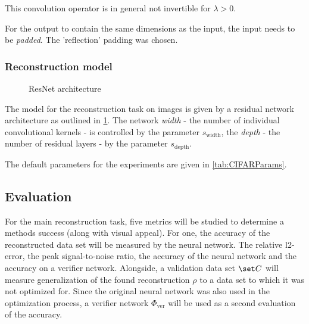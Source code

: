 This convolution operator is in general not invertible for $\lambda > 0$.

For the output to contain the same dimensions as the input, the input needs to be \textit{padded}.
The 'reflection' padding was chosen.


\subsubsection{Reconstruction model}

\begin{figure}
\begin{minipage}{0.5\textwidth}
\centering

\end{minipage}
\begin{minipage}{0.5\textwidth}
\centering

\end{minipage}
\caption{ResNet architecture}
\label{fig:resnet}
\end{figure}

The model for the reconstruction task on images is given by a residual network architecture
as outlined in \ref{fig:resnet}. 
The network \textit{width} - the number of individual convolutional kernels - is controlled by the parameter $s_\text{width}$, the \textit{depth} - the number of residual layers - by the parameter
$s_\text{depth}$.

The default parameters for the experiments are given in \ref{tab:CIFARParams}.




\subsection{Evaluation}




For the main reconstruction task, 
five metrics will be studied to determine a methods success (along with visual appeal).
For one, the accuracy of the reconstructed data set will be measured by the neural network.
The relative l2-error, the peak signal-to-noise ratio, the accuracy of the neural network and the accuracy on a verifier network.
Alongside, a validation data set $\set C$ will measure generalization of the found reconstruction $\rho$ to a data set to which it was not optimized for.
Since the original neural network was also used in the optimization process, a verifier network $\Phi_{\text{ver}}$ will be used as a second evaluation of the accuracy.

